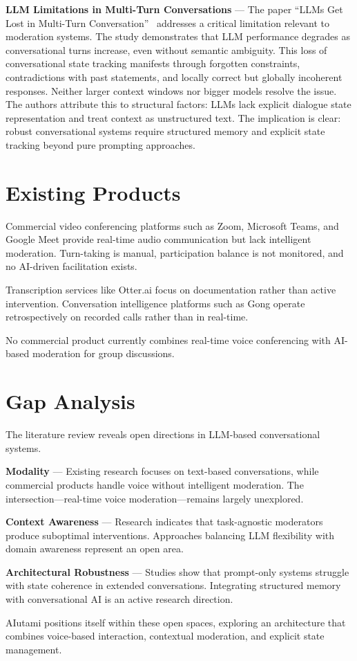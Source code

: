 \textbf{LLM Limitations in Multi-Turn Conversations} --- The paper ``LLMs Get Lost in Multi-Turn Conversation''~\cite{Laban2025LLMsGetLost} addresses a critical limitation relevant to moderation systems. The study demonstrates that LLM performance degrades as conversational turns increase, even without semantic ambiguity. This loss of conversational state tracking manifests through forgotten constraints, contradictions with past statements, and locally correct but globally incoherent responses. Neither larger context windows nor bigger models resolve the issue. The authors attribute this to structural factors: LLMs lack explicit dialogue state representation and treat context as unstructured text. The implication is clear: robust conversational systems require structured memory and explicit state tracking beyond pure prompting approaches.

\section{Existing Products}

Commercial video conferencing platforms such as Zoom, Microsoft Teams, and Google Meet provide real-time audio communication but lack intelligent moderation. Turn-taking is manual, participation balance is not monitored, and no AI-driven facilitation exists.

Transcription services like Otter.ai focus on documentation rather than active intervention. Conversation intelligence platforms such as Gong operate retrospectively on recorded calls rather than in real-time.

No commercial product currently combines real-time voice conferencing with AI-based moderation for group discussions.

\section{Gap Analysis}

The literature review reveals open directions in LLM-based conversational systems.

\textbf{Modality} --- Existing research focuses on text-based conversations, while commercial products handle voice without intelligent moderation. The intersection---real-time voice moderation---remains largely unexplored.

\textbf{Context Awareness} --- Research indicates that task-agnostic moderators produce suboptimal interventions. Approaches balancing LLM flexibility with domain awareness represent an open area.

\textbf{Architectural Robustness} --- Studies show that prompt-only systems struggle with state coherence in extended conversations. Integrating structured memory with conversational AI is an active research direction.

AIutami positions itself within these open spaces, exploring an architecture that combines voice-based interaction, contextual moderation, and explicit state management.
